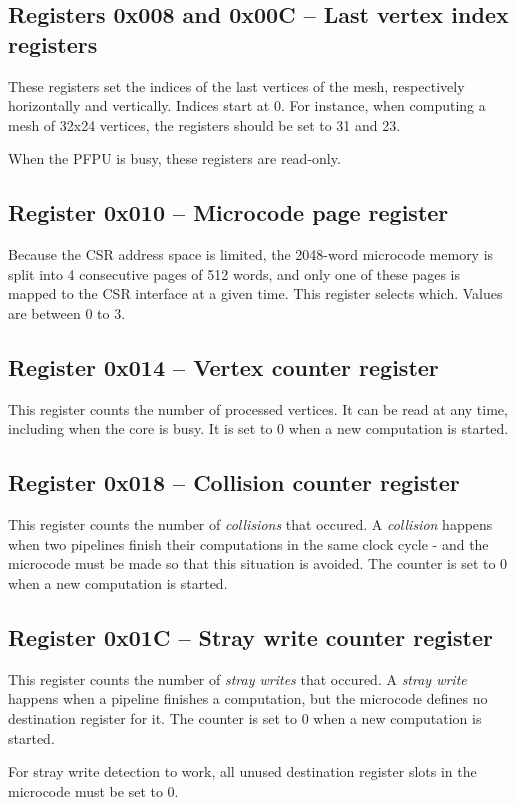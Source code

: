 \documentclass[a4paper,11pt]{article}
\begin{document}
\subsection{Registers 0x008 and 0x00C -- Last vertex index registers}
These registers set the indices of the last vertices of the mesh, respectively horizontally and vertically. Indices start at 0. For instance, when computing a mesh of 32x24 vertices, the registers should be set to 31 and 23.

When the PFPU is busy, these registers are read-only.

\subsection{Register 0x010 -- Microcode page register}
Because the CSR address space is limited, the 2048-word microcode memory is split into 4 consecutive pages of 512 words, and only one of these pages is mapped to the CSR interface at a given time. This register selects which. Values are between 0 to 3.

\subsection{Register 0x014 -- Vertex counter register}
This register counts the number of processed vertices. It can be read at any time, including when the core is busy. It is set to 0 when a new computation is started.

\subsection{Register 0x018 -- Collision counter register}
This register counts the number of \textit{collisions} that occured. A \textit{collision} happens when two pipelines finish their computations in the same clock cycle - and the microcode must be made so that this situation is avoided. The counter is set to 0 when a new computation is started.

\subsection{Register 0x01C -- Stray write counter register}
This register counts the number of \textit{stray writes} that occured. A \textit{stray write} happens when a pipeline finishes a computation, but the microcode defines no destination register for it. The counter is set to 0 when a new computation is started.

For stray write detection to work, all unused destination register slots in the microcode must be set to 0.
\end{document}
